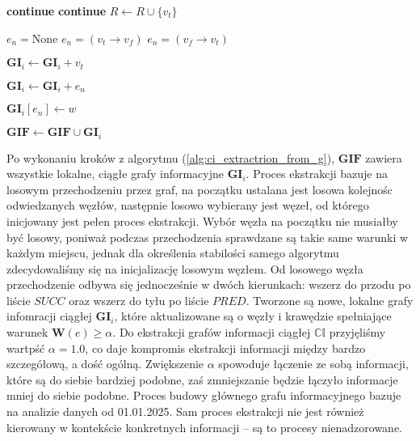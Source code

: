 \begin{algorithm}
\begin{algorithmic}
                    \State \textbf{continue}
                    \State \textbf{continue}
                \Else
                    \State $R \gets R \cup \{ v_t \}$
                \EndIf

                \State $e_n = \text{None}$
                    \State $e_n = (v_t \xrightarrow{} v_f)$
                \Else
                    \State $e_n = (v_f \xrightarrow{} v_t)$
                \EndIf

                    \State $\mathbf{GI}_i \gets \mathbf{GI}_i + v_t$
                \EndIf

                    \State $\mathbf{GI}_i \gets \mathbf{GI}_i + e_n$

                    \State $\mathbf{GI}_i[e_n] \gets w$
                \EndIf
            \EndFor

            \State $\mathbf{GIF} \gets \mathbf{GIF} \cup \mathbf{GI}_i$
            
        \EndWhile
    \end{algorithmic}
\end{algorithm}
Po wykonaniu kroków z algorytmu (\ref{alg:ci_extractrion_from_g}), $\mathbf{GIF}$
zawiera wszystkie lokalne, ciągłe grafy informacyjne $\mathbf{GI}_i$.
Proces ekstrakcji bazuje na losowym przechodzeniu przez graf, na początku ustalana
jest losowa kolejnośc odwiedzanych węzłów, następnie losowo wybierany jest węzeł,
od którego inicjowany jest pełen proces ekstrakcji. Wybór węzła na początku nie musiałby
być losowy, poniważ podczas przechodzenia sprawdzane są takie same warunki w każdym
miejscu, jednak dla określenia stabilości samego algorytmu zdecydowaliśmy się
na inicjalizację losowym węzłem. Od losowego węzła przechodzenie odbywa się jednocześnie
w dwóch kierunkach: wszerz do przodu po liście $SUCC$ oraz wszerz do tyłu po liście $PRED$.
Tworzone są nowe, lokalne grafy infomracji ciągłej $\mathbf{GI}_i$, które 
aktualizowane są o węzły i krawędzie spełniające warunek $\mathbf{W}(e) \geq \alpha$. 
Do ekstrakcji grafów informacji ciągłej $\mathbb{CI}$ przyjęliśmy wartpść $\alpha = 1.0$, 
co daje kompromis ekstrakcji informacji między bardzo szczegółową, a dość ogólną. 
Zwiększenie $\alpha$ spowoduje łączenie ze sobą informacji, które są do siebie bardziej 
podobne, zaś zmniejszanie będzie łączyło informacje mniej do siebie podobne. 
Proces budowy głównego grafu informacyjnego bazuje na analizie danych od 01.01.2025. 
Sam proces ekstrakcji nie jest również kierowany w kontekście konkretnych informacji 
-- są to procesy nienadzorowane.

